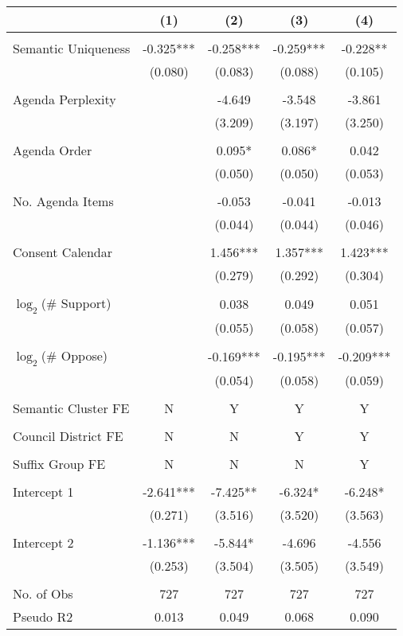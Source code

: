 \begin{tabular}{lcccc}
\toprule
 & (1) & (2) & (3) & (4) \\
\midrule
 &  &  &  &  \\
Semantic Uniqueness & -0.325*** & -0.258*** & -0.259*** & -0.228** \\
 & (0.080) & (0.083) & (0.088) & (0.105) \\
 &  &  &  &  \\
Agenda Perplexity &  & -4.649 & -3.548 & -3.861 \\
 &  & (3.209) & (3.197) & (3.250) \\
 &  &  &  &  \\
Agenda Order &  & 0.095* & 0.086* & 0.042 \\
 &  & (0.050) & (0.050) & (0.053) \\
 &  &  &  &  \\
No. Agenda Items &  & -0.053 & -0.041 & -0.013 \\
 &  & (0.044) & (0.044) & (0.046) \\
 &  &  &  &  \\
Consent Calendar &  & 1.456*** & 1.357*** & 1.423*** \\
 &  & (0.279) & (0.292) & (0.304) \\
 &  &  &  &  \\
$\log_2$(\# Support) &  & 0.038 & 0.049 & 0.051 \\
 &  & (0.055) & (0.058) & (0.057) \\
 &  &  &  &  \\
$\log_2$(\# Oppose) &  & -0.169*** & -0.195*** & -0.209*** \\
 &  & (0.054) & (0.058) & (0.059) \\
 &  &  &  &  \\
Semantic Cluster FE & N & Y & Y & Y \\
 &  &  &  &  \\
Council District FE & N & N & Y & Y \\
 &  &  &  &  \\
Suffix Group FE & N & N & N & Y \\
 &  &  &  &  \\
Intercept 1 & -2.641*** & -7.425** & -6.324* & -6.248* \\
 & (0.271) & (3.516) & (3.520) & (3.563) \\
 &  &  &  &  \\
Intercept 2 & -1.136*** & -5.844* & -4.696 & -4.556 \\
 & (0.253) & (3.504) & (3.505) & (3.549) \\
 &  &  &  &  \\
No. of Obs & 727 & 727 & 727 & 727 \\
Pseudo R2 & 0.013 & 0.049 & 0.068 & 0.090 \\
\bottomrule
\end{tabular}
